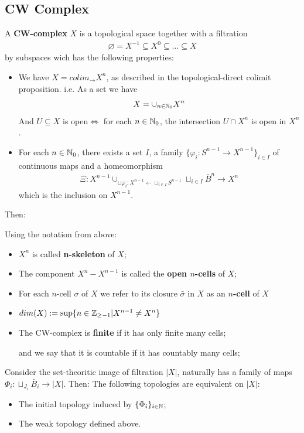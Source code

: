 \documentclass[Total.tex]{subfiles}
\begin{document}
	\subsection{CW Complex}
	\begin{Def}
		A \textbf{CW-complex} $X$ is a topological space together with a filtration
		\begin{gather*}
			\varnothing=X^{-1}\subseteq X^0\subseteq \dots\subseteq X
		\end{gather*}
		by subspaces wich has the following properties:
		\begin{itemize}
			\item We have $X=colim_{\rightarrow} X^n$, as described in the topological-direct colimit proposition. i.e. As a set we have
			\begin{gather*}
				X=\cup_{n\in \mathbb{N}_0} X^n
			\end{gather*}
			And $U\subseteq X$ is open$\Leftrightarrow$ for each $n\in \mathbb{N}_0$, the intersection $U\cap X^n$ is open in $X^n$.
			\item For each $n\in \mathbb{N}_0$, there exists a set $I$, a family $\{\varphi_i:S^{n-1}\rightarrow X^{n-1}\}_{i\in I}$ of continuous maps and a homeomorphism
			\begin{gather*}
				\Xi:X^{n-1}\cup_{\sqcup \varphi_i:X^{n-1}\leftarrow \sqcup_{i\in I} S^{n-1}} \sqcup_{i\in I} \bar{B}^n\rightarrow X^n
			\end{gather*}
			which is the inclusion on $X^{n-1}$. 
		\end{itemize}
	\end{Def}
	Then:
	\begin{Def}
		Using the notation from above:
		\begin{itemize}
			\item $X^n$ is called \textbf{n-skeleton} of $X$;
			\item The component $X^n-X^{n-1}$ is called the \textbf{open $n$-cells} of $X$;
			\item For each $n$-cell $\sigma$ of $X$ we refer to its closure $\bar{\sigma}$ in $X$ as an \textbf{$n$-cell} of $X$
			\item $dim(X):=\sup\{n\in \mathbb{Z}_{\geq -1}|X^{n-1}\not= X^n\}$
			\item The CW-complex is \textbf{finite} if it has only finite many cells;
			
			 and we say that it is countable if it has countably many cells;
		\end{itemize}
	\end{Def}
	\begin{proposition}
		Consider the set-theoritic image of filtration $|X|$, naturally has a family of maps $\Phi_i: \sqcup_{J_i} \bar{B}_i\rightarrow |X|$. Then: The following topologies are equivalent on $|X|$:
		\begin{itemize}
			\item The initial topology induced by $\{\Phi_i\}_{i\in \mathbb{N}}$;
			\item The weak topology defined above.
		\end{itemize}
	\end{proposition}
\end{document}
